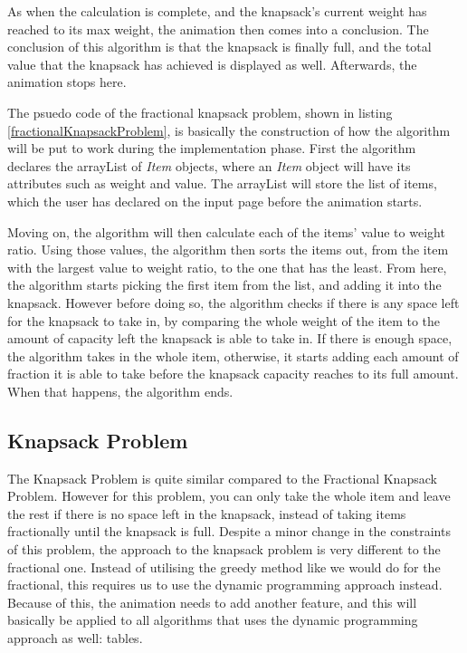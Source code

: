 As when the calculation is complete, and the knapsack's current weight has reached to its max weight, the animation then comes into a conclusion. The conclusion of this algorithm is that the knapsack is finally full, and the total value that the knapsack has achieved is displayed as well. Afterwards, the animation stops here. 

\newpage



The psuedo code of the fractional knapsack problem, shown in listing \ref{fractionalKnapsackProblem}, is basically the construction of how the algorithm will be put to work during the implementation phase. First the algorithm declares the arrayList of \textit{Item} objects, where an \textit{Item} object will have its attributes such as weight and value. The arrayList will store the list of items, which the user has declared on the input page before the animation starts.

Moving on, the algorithm will then calculate each of the items' value to weight ratio. Using those values, the algorithm then sorts the items out, from the item with the largest value to weight ratio, to the one that has the least. From here, the algorithm starts picking the first item from the list, and adding it into the knapsack. However before doing so, the algorithm checks if there is any space left for the knapsack to take in, by comparing the whole weight of the item to the amount of capacity left the knapsack is able to take in. If there is enough space, the algorithm takes in the whole item, otherwise, it starts adding each amount of fraction it is able to take before the knapsack capacity reaches to its full amount. When that happens, the algorithm ends.

\subsection{Knapsack Problem}

The Knapsack Problem is quite similar compared to the Fractional Knapsack Problem. However for this problem, you can only take the whole item and leave the rest if there is no space left in the knapsack, instead of taking items fractionally until the knapsack is full. Despite a minor change in the constraints of this problem, the approach to the knapsack problem is very different to the fractional one. Instead of utilising the greedy method like we would do for the fractional, this requires us to use the dynamic programming approach instead. Because of this, the animation needs to add another feature, and this will basically be applied to all algorithms that uses the dynamic programming approach as well: tables.

